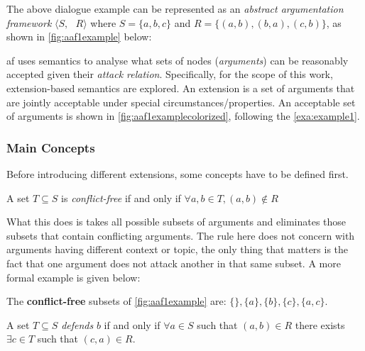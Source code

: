         The above dialogue example can be represented as an \textit{abstract argumentation framework} $\langle S, \text{ }R \rangle$ where $S = \{a, b, c\}$ and $R = \{(a, b), (b, a), (c, b)\}$, as shown in \autoref{fig:aaf1example} below:
        
        \FloatBarrier
        
        \gls{af} uses semantics to analyse what sets of nodes (\textit{arguments}) can be reasonably accepted given their \textit{attack relation}. Specifically, for the scope of this work, extension-based semantics are explored. An extension is a set of arguments that are jointly acceptable under special circumstances/properties. An acceptable set of arguments is shown in \autoref{fig:aaf1examplecolorized}, following the \cref{exa:example1}.
        
        \FloatBarrier
        
        \subsubsection{Main Concepts}
            Before introducing different extensions, some concepts have to be defined first.
            \begin{definition}
                A set $T \subseteq S$ is \textit{conflict-free} if and only if $ \forall a, b \in T, (a, b) \notin R$
                \label{definition:definition2}
            \end{definition}
            
            What this does is takes all possible subsets of arguments and eliminates those subsets that contain conflicting arguments. The rule here does not concern with arguments having different context or topic, the only thing that matters is the fact that one argument does not attack another in that same subset. A more formal example is given below:
            
            \begin{exa}
                The \textbf{conflict-free} subsets of \autoref{fig:aaf1example} are: $\{\}, \{a\}, \{b\}, \{c\}, \{a, c\}$.
                \label{exa:example2}
            \end{exa}
            
            \begin{definition}
                A set $T \subseteq S$ \textit{defends} $b$ if and only if $ \forall a \in S$ such that $(a, b) \in R$ there exists $\exists c \in T$ such that $(c, a) \in R$.
                \label{definition:definition3}
            \end{definition}
            
